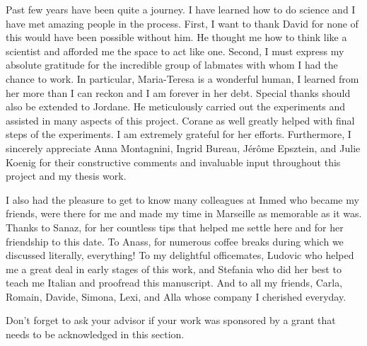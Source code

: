 Past few years have been quite a journey.
I have learned how to do science and I have met amazing people in the process.
First, I want to thank David for none of this would have been possible without him.
He thought me how to think like a scientist and afforded me the space to act like one.
Second, I must express my absolute gratitude for the incredible group of labmates with whom I had the chance to work.
In particular, Maria-Teresa is a wonderful human, I learned from her more than I can reckon and I am forever in her debt.
Special thanks should also be extended to Jordane.
He meticulously carried out the experiments and assisted in many aspects of this project.
Corane as well greatly helped with final steps of the experiments.
I am extremely grateful for her efforts.
Furthermore, I sincerely appreciate Anna Montagnini, Ingrid Bureau, J\'{e}r\^{o}me Epsztein, and Julie Koenig for their constructive comments and invaluable input throughout this project and my thesis work.
\par
I also had the pleasure to get to know many colleagues at Inmed who became my friends, were there for me and made my time in Marseille as memorable as it was.
Thanks to Sanaz, for her countless tips that helped me settle here and for her friendship to this date.
To Anass, for numerous coffee breaks during which we discussed literally, everything!
To my delightful officemates, Ludovic who helped me a great deal in early stages of this work, and Stefania who did her best to teach me Italian and proofread this manuscript.
And to all my friends, Carla, Romain, Davide, Simona, Lexi, and Alla whose company I cherished everyday.






Don't forget to ask your advisor if your work was sponsored by a grant that needs to be acknowledged in this section.  